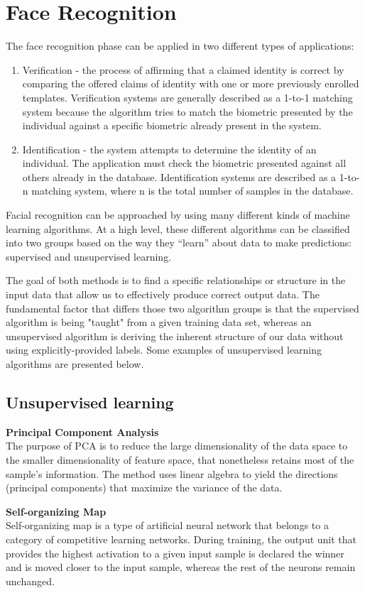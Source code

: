 \section{Face Recognition}
The face recognition phase can be applied in two different types of applications: 

\begin{enumerate}
\itemsep0em
\item Verification - the process of affirming that a claimed identity is correct by comparing the offered claims of identity with one or more previously enrolled templates. Verification systems are generally described as a 1-to-1 matching system because the algorithm tries to match the biometric presented by the individual against a specific biometric already present in the system.
\item Identification - the system attempts to determine the identity of an individual. The application  must check the biometric presented against all others already in the database. Identification systems are described as a 1-to-n matching system, where n is the total number of samples in the database. 
\end{enumerate}

Facial recognition can be approached by using many different kinds of machine learning algorithms. At a high level, these different algorithms can be classified into two groups based on the way they “learn” about data to make predictions: supervised and unsupervised learning.

The goal of both methods is to find a specific relationships or structure in the input data that allow us to effectively produce correct output data. The fundamental factor that differs those two algorithm groups is that the supervised algorithm is being "taught" from a given training data set, whereas an unsupervised algorithm is deriving the inherent structure of our data without using explicitly-provided labels. Some examples of unsupervised learning algorithms are presented below.

\subsection{Unsupervised learning}
\par
\textbf{Principal Component Analysis}
\\
The purpose of PCA is to reduce the large dimensionality of the data space to the smaller dimensionality of feature space, that nonetheless retains most of the sample's information. The method uses linear algebra to yield the directions (principal components) that maximize the variance of the data. 
\\
\par
\textbf{Self-organizing Map}
\\
Self-organizing map is a type of artificial neural network that belongs to a category of competitive learning networks. During training, the output unit that provides the highest activation to a given input sample is declared the winner and is moved closer to the input sample, whereas the rest of the neurons remain unchanged.

